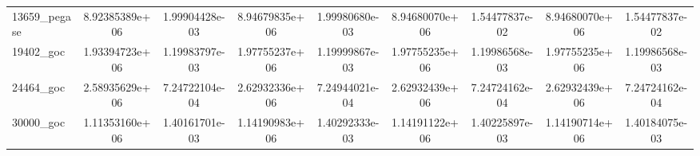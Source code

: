 \documentclass{standalone}
\begin{document}
\begin{tabular}{|l|cc|cc|cc|cc|}
13659\_pegase 
& 8.92385389e+06
& 1.99904428e-03
& 8.94679835e+06
& 1.99980680e-03
& 8.94680070e+06
& 1.54477837e-02
& 8.94680070e+06
& 1.54477837e-02
\\

19402\_goc 
& 1.93394723e+06
& 1.19983797e-03
& 1.97755237e+06
& 1.19999867e-03
& 1.97755235e+06
& 1.19986568e-03
& 1.97755235e+06
& 1.19986568e-03
\\

24464\_goc 
& 2.58935629e+06
& 7.24722104e-04
& 2.62932336e+06
& 7.24944021e-04
& 2.62932439e+06
& 7.24724162e-04
& 2.62932439e+06
& 7.24724162e-04
\\

30000\_goc 
& 1.11353160e+06
& 1.40161701e-03
& 1.14190983e+06
& 1.40292333e-03
& 1.14191122e+06
& 1.40225897e-03
& 1.14190714e+06
& 1.40184075e-03

  \\
  \hline
\end{tabular}
\end{document}
